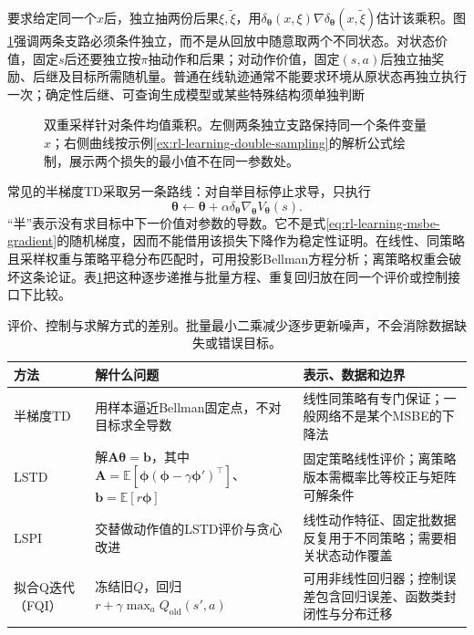 要求给定同一个$x$后，独立抽两份后果$\xi,\widetilde\xi$，用$\delta_{\bm{\theta}}(x,\xi)\nabla\delta_{\bm{\theta}}(x,\widetilde\xi)$估计该乘积。图\ref{fig:rl-learning-double-sampling}强调两条支路必须条件独立，而不是从回放中随意取两个不同状态。对状态价值，固定$s$后还要独立按$\pi$抽动作和后果；对动作价值，固定$(s,a)$后独立抽奖励、后继及目标所需随机量。普通在线轨迹通常不能要求环境从原状态再独立执行一次；确定性后继、可查询生成模型或某些特殊结构须单独判断

\begin{figure}[t]
  \centering
  
  \caption{双重采样针对条件均值乘积。左侧两条独立支路保持同一个条件变量$x$；右侧曲线按示例\ref{ex:rl-learning-double-sampling}的解析公式绘制，展示两个损失的最小值不在同一参数处。}
  \label{fig:rl-learning-double-sampling}
\end{figure}

常见的半梯度TD采取另一条路线：对自举目标停止求导，只执行
\[
  \bm{\theta}\leftarrow\bm{\theta}
       +\alpha\delta_{\bm{\theta}}
                    \nabla_{\bm{\theta}}V_{\bm{\theta}}(s).
\]
“半”表示没有求目标中下一价值对参数的导数。它不是式\eqref{eq:rl-learning-msbe-gradient}的随机梯度，因而不能借用该损失下降作为稳定性证明。在线性、同策略且采样权重与策略平稳分布匹配时，可用投影Bellman方程分析；离策略权重会破坏这条论证。表\ref{tab:rl-learning-fitted-methods}把这种逐步递推与批量方程、重复回归放在同一个评价或控制接口下比较。

\begin{table}[t]
  \centering
  \small
  \begin{tabularx}{\linewidth}{>{\raggedright\arraybackslash}p{23mm} >{\raggedright\arraybackslash}X >{\raggedright\arraybackslash}X}
    \toprule
    方法 & 解什么问题 & 表示、数据和边界 \\
    \midrule
    半梯度TD & 用样本逼近Bellman固定点，不对目标求全导数 & 线性同策略有专门保证；一般网络不是某个MSBE的下降法 \\
    LSTD & 解$\bm{A}\bm{\theta}=\bm{b}$，其中$\bm{A}=\mathbb E[\bm{\phi}(\bm{\phi}-\gamma\bm{\phi}')^\top]$、$\bm{b}=\mathbb E[r\bm{\phi}]$ & 固定策略线性评价；离策略版本需概率比等校正与矩阵可解条件 \\
    LSPI & 交替做动作值的LSTD评价与贪心改进 & 线性动作特征、固定批数据反复用于不同策略；需要相关状态动作覆盖 \\
    拟合Q迭代（FQI） & 冻结旧$Q$，回归$r+\gamma\max_aQ_{\mathrm{old}}(s',a)$ & 可用非线性回归器；控制误差包含回归误差、函数类封闭性与分布迁移 \\
    \bottomrule
  \end{tabularx}
  \caption{评价、控制与求解方式的差别。批量最小二乘减少逐步更新噪声，不会消除数据缺失或错误目标。}
  \label{tab:rl-learning-fitted-methods}
\end{table}

